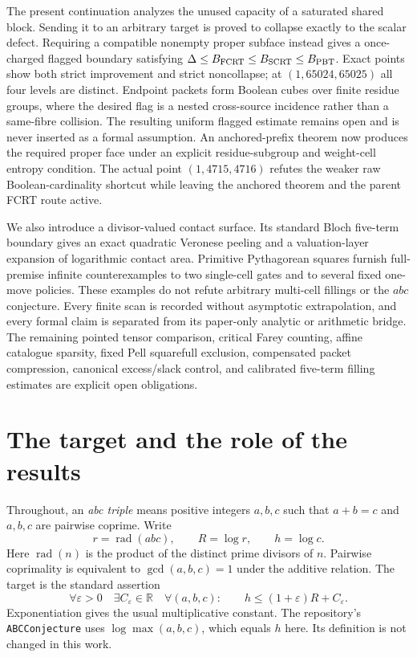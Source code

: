 \documentclass[11pt]{amsart}
\theoremstyle{definition}
\theoremstyle{remark}
\newcommand{\R}{\mathbb R}
\newcommand{\rad}{\operatorname{rad}}
\newcommand{\eps}{\varepsilon}
\begin{document}
The present continuation analyzes the unused capacity of a saturated shared
block.  Sending it to an arbitrary target is proved to collapse exactly to
the scalar defect.  Requiring a compatible nonempty proper subface instead
gives a once-charged flagged boundary satisfying
$\Delta\le B_{\rm FCRT}\le B_{\rm SCRT}\le B_{\rm PBT}$.  Exact points show
both strict improvement and strict noncollapse; at
$(1,65024,65025)$ all four levels are distinct.  Endpoint packets form
Boolean cubes over finite residue groups, where the desired flag is a nested
cross-source incidence rather than a same-fibre collision.  The resulting
uniform flagged estimate remains open and is never inserted as a formal
assumption.  An anchored-prefix theorem now produces the required proper face
under an explicit residue-subgroup and weight-cell entropy condition.  The
actual point $(1,4715,4716)$ refutes the weaker raw Boolean-cardinality
shortcut while leaving the anchored theorem and the parent FCRT route active.

We also introduce a divisor-valued contact surface.  Its standard Bloch
five-term boundary gives an exact quadratic Veronese peeling and a
valuation-layer expansion of logarithmic contact area.  Primitive
Pythagorean squares furnish full-premise infinite counterexamples to two
single-cell gates and to several fixed one-move policies.  These examples do
not refute arbitrary multi-cell fillings or the $abc$ conjecture.  Every
finite scan is recorded without asymptotic extrapolation, and every formal
claim is separated from its paper-only analytic or arithmetic bridge.  The
remaining pointed tensor comparison, critical Farey counting, affine
catalogue sparsity, fixed Pell squarefull exclusion, compensated packet
compression, canonical excess/slack control, and calibrated five-term filling
estimates are explicit open obligations.
\section{The target and the role of the results}

Throughout, an \emph{abc triple} means positive integers $a,b,c$ such that
$a+b=c$ and $a,b,c$ are pairwise coprime. Write
\[
 r=\rad(abc),\qquad R=\log r,\qquad h=\log c.
\]
Here $\rad(n)$ is the product of the distinct prime divisors of $n$.
Pairwise coprimality is equivalent to $\gcd(a,b,c)=1$ under the additive
relation. The target is the standard assertion
\begin{equation}\label{eq:abc}
 \forall\eps>0\quad\exists C_\eps\in\R\quad
 \forall(a,b,c):\qquad h\le(1+\eps)R+C_\eps.
\end{equation}
Exponentiation gives the usual multiplicative constant. The repository's
\texttt{ABCConjecture} uses $\log\max(a,b,c)$, which equals $h$ here.
Its definition is not changed in this work.
\end{document}
